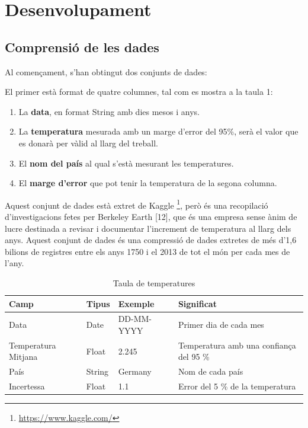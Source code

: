 \documentclass[10pt,a4paper,twocolumn,twoside]{article}
\begin{document}
\section {Desenvolupament}
\subsection{Comprensió de les dades}
Al començament, s'han obtingut dos conjunts de dades:

El primer està format de quatre columnes, tal com es mostra a la taula 1:
\begin{enumerate}
\item La \textbf{data}, en format String amb dies mesos i anys.
\item La \textbf{temperatura} mesurada amb un marge d'error del 95\%, serà el valor que es donarà per vàlid al llarg del treball. 
\item El \textbf{nom del país} al qual s'està mesurant les temperatures.
\item El \textbf{marge d'error} que pot tenir la temperatura de la segona columna.
\end{enumerate}
Aquest conjunt de dades està extret de Kaggle \footnote{\url{https://www.kaggle.com/}}, però és una recopilació d'investigacions fetes per Berkeley Earth [12], que és una empresa sense ànim de lucre destinada a revisar i documentar l'increment de temperatura al llarg dels anys. Aquest conjunt de dades és una compressió de dades extretes de més d'1,6 bilions de registres entre els anys 1750 i el 2013 de tot el món per cada mes de l'any.

\begin{table}[th]
\caption{Taula de temperatures}
\begin{center}
\begin{tabular}{  m{1cm} m{1cm} m{1cm} m{3cm} }
\hline\hline %
Camp & Tipus & Exemple & Significat \\
\hline
Data & Date & DD-MM-YYYY & Primer dia de cada mes \\
\hline
Temperatura Mitjana & Float & 2.245 & Temperatura amb una confiança del 95 \%  \\
\hline
País & String & Germany & Nom de cada país \\
\hline
Incertessa & Float & 1.1 & Error del 5 \% de la temperatura\\
\hline
\hline
\end{tabular}
\end{center}
\end{table}
\end{document}
